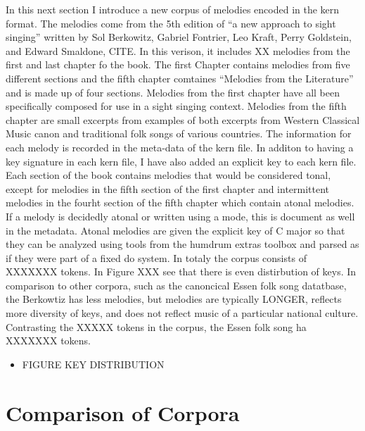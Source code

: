 \documentclass[]{book}
\providecommand{\tightlist}{%
  \setlength{\itemsep}{0pt}\setlength{\parskip}{0pt}}
\begin{document}
In this next section I introduce a new corpus of melodies encoded in the kern format.
The melodies come from the 5th edition of ``a new approach to sight singing'' written by Sol Berkowitz, Gabriel Fontrier, Leo Kraft, Perry Goldstein, and Edward Smaldone, CITE.
In this verison, it includes XX melodies from the first and last chapter fo the book.
The first Chapter contains melodies from five different sections and the fifth chapter comtaines ``Melodies from the Literature'' and is made up of four sections.
Melodies from the first chapter have all been specifically composed for use in a sight singing context.
Melodies from the fifth chapter are small excerpts from examples of both excerpts from Western Classical Music canon and traditional folk songs of various countries.
The information for each melody is recorded in the meta-data of the kern file.
In additon to having a key signature in each kern file, I have also added an explicit key to each kern file.
Each section of the book contains melodies that would be considered tonal, except for melodies in the fifth section of the first chapter and intermittent melodies in the fourht section of the fifth chapter which contain atonal melodies.
If a melody is decidedly atonal or written using a mode, this is document as well in the metadata.
Atonal melodies are given the explicit key of C major so that they can be analyzed using tools from the humdrum extras toolbox and parsed as if they were part of a fixed do system.
In totaly the corpus consists of XXXXXXX tokens.
In Figure XXX see that there is even distirbution of keys.
In comparison to other corpora, such as the canoncical Essen folk song datatbase, the Berkowtiz has less melodies, but melodies are typically LONGER, reflects more diversity of keys, and does not reflect music of a particular national culture.
Contrasting the XXXXX tokens in the corpus, the Essen folk song ha XXXXXXX tokens.

\begin{itemize}
\tightlist
\item
  FIGURE KEY DISTRIBUTION
\end{itemize}

\hypertarget{comparison-of-corpora}{%
\section{Comparison of Corpora}\label{comparison-of-corpora}}
\end{document}
